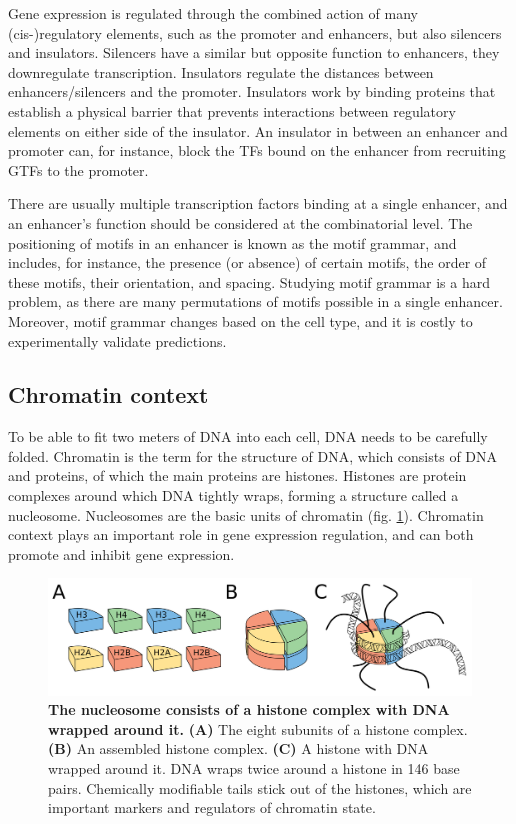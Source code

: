 Gene expression is regulated through the combined action of many (cis-)regulatory elements, such as the promoter and enhancers, but also silencers and insulators\cite{Spitz2012}. Silencers have a similar but opposite function to enhancers, they downregulate transcription. Insulators regulate the distances between enhancers/silencers and the promoter. Insulators work by binding proteins that establish a physical barrier that prevents interactions between regulatory elements on either side of the insulator. An insulator in between an enhancer and promoter can, for instance, block the TFs bound on the enhancer from recruiting GTFs to the promoter.

There are usually multiple transcription factors binding at a single enhancer, and an enhancer's function should be considered at the combinatorial level. The positioning of motifs in an enhancer is known as the motif grammar, and includes, for instance, the presence (or absence) of certain motifs, the order of these motifs, their orientation, and spacing. Studying motif grammar is a hard problem, as there are many permutations of motifs possible in a single enhancer. Moreover, motif grammar changes based on the cell type, and it is costly to experimentally validate predictions.

\subsection{Chromatin context}

To be able to fit two meters of DNA into each cell, DNA needs to be carefully folded. Chromatin is the term for the structure of DNA, which consists of DNA and proteins, of which the main proteins are histones. Histones are protein complexes around which DNA tightly wraps, forming a structure called a nucleosome. Nucleosomes are the basic units of chromatin (fig. \ref{fig:histones}). Chromatin context plays an important role in gene expression regulation, and can both promote and inhibit gene expression.

\begin{figure}
    \center
    \includegraphics[width=0.8\linewidth]{ch.introduction/imgs/histones.png}
    \caption{\textbf{The nucleosome consists of a histone complex with DNA wrapped around it.} \textbf{(A)} The eight subunits of a histone complex. \textbf{(B)} An assembled histone complex. \textbf{(C)} A histone with DNA wrapped around it. DNA wraps twice around a histone in 146 base pairs. Chemically modifiable tails stick out of the histones, which are important markers and regulators of chromatin state.}
    \label{fig:histones}
\end{figure}

